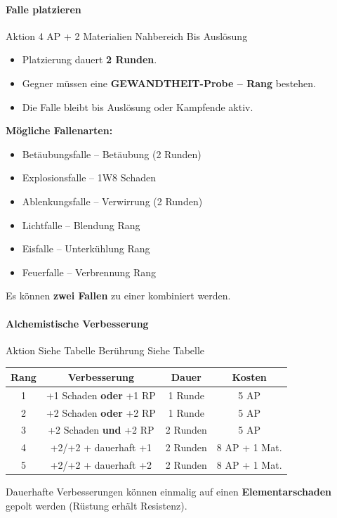 \paragraph*{Falle platzieren}

\skillcard
{}
{Aktion}
{4 AP + 2 Materialien}
{Nahbereich}
{Bis Auslösung}
{
	\begin{itemize}
		\item Platzierung dauert \textbf{2 Runden}.
		\item Gegner müssen eine \textbf{GEWANDTHEIT-Probe – Rang} bestehen.
		\item Die Falle bleibt bis Auslösung oder Kampfende aktiv.
	\end{itemize}
	
	\textbf{Mögliche Fallenarten:}
	\begin{itemize}
		\item Betäubungsfalle – Betäubung (2 Runden)
		\item Explosionsfalle – 1W8 Schaden
		\item Ablenkungsfalle – Verwirrung (2 Runden)
		\item Lichtfalle – Blendung Rang
		\item Eisfalle – Unterkühlung Rang
		\item Feuerfalle – Verbrennung Rang
	\end{itemize}
}
{
	Es können \textbf{zwei Fallen} zu einer kombiniert werden.
}

\paragraph*{Alchemistische Verbesserung}

\skillcard
{}
{Aktion}
{Siehe Tabelle}
{Berührung}
{Siehe Tabelle}
{
	\begin{center}
		\begin{tabular}{cccc}
			\toprule
			\textbf{Rang} & \textbf{Verbesserung} & \textbf{Dauer} & \textbf{Kosten} \\
			\midrule
			1 & +1 Schaden \textbf{oder} +1 RP & 1 Runde & 5 AP \\
			2 & +2 Schaden \textbf{oder} +2 RP & 1 Runde & 5 AP \\
			3 & +2 Schaden \textbf{und} +2 RP & 2 Runden & 5 AP \\
			4 & +2/+2 + dauerhaft +1 & 2 Runden & 8 AP + 1 Mat. \\
			5 & +2/+2 + dauerhaft +2 & 2 Runden & 8 AP + 1 Mat. \\
			\bottomrule
		\end{tabular}
	\end{center}
}
{
	Dauerhafte Verbesserungen können einmalig auf einen
	\textbf{Elementarschaden} gepolt werden
	(Rüstung erhält Resistenz).
}

